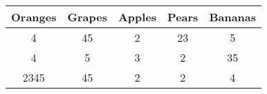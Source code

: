 \documentclass{article}
\begin{document}
\begin{tabular}{|c|c|c|c|c|}
\hline
Oranges & Grapes & Apples & Pears & Bananas \\
\hline
4 & 45 & 2 & 23 & 5 \\
4 & 5 & 3 & 2 & 35 \\
2345 & 45 & 2 & 2 & 4 \\
\hline
\end{tabular}
\end{document}
